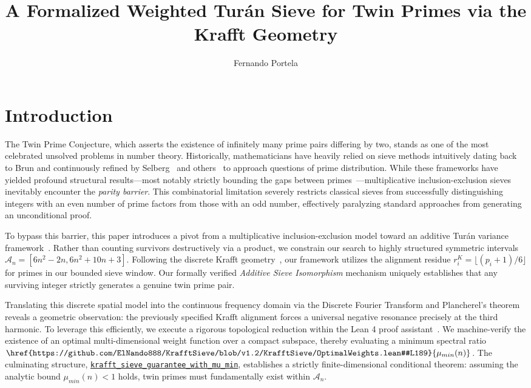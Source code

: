 \documentclass[lean]{AFM}
\title[A Formalized Weighted Turán Sieve for Twin Primes]{A Formalized Weighted
Turán Sieve for Twin Primes via the Krafft Geometry}
\author[F. Portela]{Fernando Portela}
\renewcommand{\.}{\hskip .75pt}
\def\urlpfx{https://github.com/ElNando888/KrafftSieve/blob/v1.2}
\begin{document}
\section{Introduction} \label{introduction}

The Twin Prime Conjecture, which asserts the existence of infinitely many prime pairs differing by
two, stands as one of the most celebrated unsolved problems in number theory. Historically,
mathematicians have heavily relied on sieve methods intuitively dating back to Brun and
continuously refined by Selberg~\cite{Selberg1947} and others~\cite{MontgomeryVaughan2006} to
approach questions of prime distribution. While these frameworks have yielded profound structural
results—most notably strictly bounding the gaps between
primes~\cite{GPY2009,Maynard2015,Polymath8a,Polymath8b}—multiplicative inclusion-exclusion sieves
inevitably encounter the \textit{parity barrier}. This combinatorial limitation severely restricts
classical sieves from successfully distinguishing integers with an even number of prime factors
from those with an odd number, effectively paralyzing standard approaches from generating an
unconditional proof.

To bypass this barrier, this paper introduces a pivot from a multiplicative inclusion-exclusion
model toward an additive Turán variance framework~\cite{Turan1934}. Rather than counting survivors
destructively via a product, we constrain our search to highly structured symmetric intervals
$\mathcal{A}_n = [6n^2 - 2n, 6n^2 + 10n + 3]$. Following the discrete Krafft
geometry~\cite{Krafft1801,Portela2026}, our framework utilizes the alignment residue
$r^K_i = \lfloor(p_i+1)/6\rfloor$ for primes in our bounded sieve window. Our formally verified
\textit{Additive Sieve Isomorphism} mechanism uniquely establishes that any surviving integer
strictly generates a genuine twin prime pair.

Translating this discrete spatial model into the continuous frequency domain via the Discrete
Fourier Transform and Plancherel's theorem reveals a geometric observation: the previously specified
Krafft alignment forces a universal negative resonance precisely at the third harmonic. To
leverage this efficiently, we execute a rigorous topological reduction within the Lean 4 proof
assistant~\cite{MouraUllrich2021,Mathlib}. We machine-verify the existence of an optimal
multi-dimensional weight function over a compact subspace, thereby evaluating a minimum
spectral ratio $\href{\urlpfx/KrafftSieve/OptimalWeights.lean#L189}{\mu_{min}(n)}$. The culminating
structure, \href{\urlpfx/KrafftSieve/OptimalWeights.lean#L668}
{\texttt{krafft\_sieve\_guarantee\_with\_mu\_min}}, establishes a strictly finite-dimensional
conditional theorem: assuming the analytic bound $\mu_{min}(n) < 1$ holds, twin primes must
fundamentally exist within $\mathcal{A}_n$.
\end{document}
